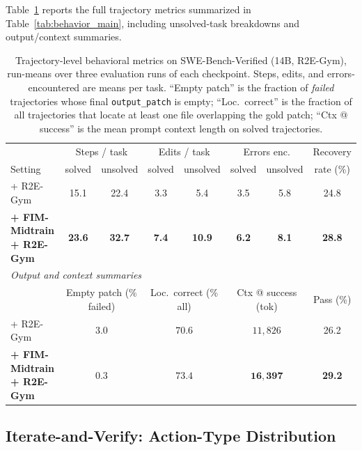 Table~\ref{tab:behavior_full} reports the full trajectory metrics
summarized in Table~\ref{tab:behavior_main}, including unsolved-task
breakdowns and output/context summaries.

\begin{table}[h]
\centering
\caption{Trajectory-level behavioral metrics on SWE-Bench-Verified
(14B, R2E-Gym), run-means over three evaluation runs of each
checkpoint. Steps, edits, and errors-encountered are means per task.
``Empty patch'' is the fraction of \emph{failed} trajectories whose
final \texttt{output\_patch} is empty; ``Loc.\ correct'' is the
fraction of all trajectories that locate at least one file overlapping
the gold patch; ``Ctx @ success'' is the mean prompt context length on
solved trajectories.}
\label{tab:behavior_full}
\small
\setlength{\tabcolsep}{4pt}
\begin{tabular}{l c c c c c c c}
\toprule
& \multicolumn{2}{c}{Steps / task}
& \multicolumn{2}{c}{Edits / task}
& \multicolumn{2}{c}{Errors enc.}
& Recovery \\
\cmidrule(lr){2-3}\cmidrule(lr){4-5}\cmidrule(lr){6-7}
Setting & solved & unsolved & solved & unsolved & solved & unsolved & rate (\%) \\
\midrule
+ R2E-Gym
  & 15.1 & 22.4 & 3.3 & 5.4 & 3.5 & 5.8 & 24.8 \\
\textbf{+ FIM-Midtrain + R2E-Gym}
  & \textbf{23.6} & \textbf{32.7} & \textbf{7.4} & \textbf{10.9}
  & \textbf{6.2} & \textbf{8.1} & \textbf{28.8} \\
\midrule
\multicolumn{8}{l}{\textit{Output and context summaries}} \\
\midrule
& \multicolumn{2}{c}{Empty patch (\% failed)}
& \multicolumn{2}{c}{Loc.\ correct (\% all)}
& \multicolumn{2}{c}{Ctx @ success (tok)}
& Pass (\%) \\
\cmidrule(lr){2-3}\cmidrule(lr){4-5}\cmidrule(lr){6-7}
+ R2E-Gym
  & \multicolumn{2}{c}{$3.0$} & \multicolumn{2}{c}{$70.6$}
  & \multicolumn{2}{c}{$11{,}826$} & 26.2 \\
\textbf{+ FIM-Midtrain + R2E-Gym}
  & \multicolumn{2}{c}{$\mathbf{0.3}$} & \multicolumn{2}{c}{$\mathbf{73.4}$}
  & \multicolumn{2}{c}{$\mathbf{16{,}397}$} & \textbf{29.2} \\
\bottomrule
\end{tabular}
\end{table}

\subsection{Iterate-and-Verify: Action-Type Distribution}
\label{app:behavior_extra:actions}

